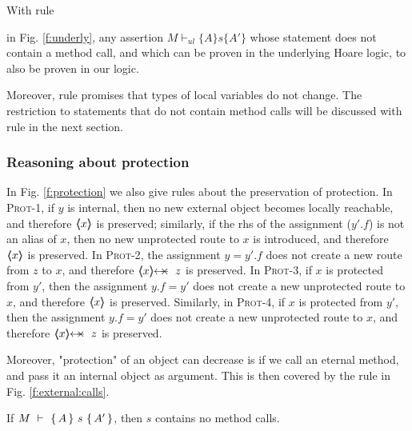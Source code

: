 \begin{axiom}
\label{ax:ul}
\end{axiom}

With rule {{\sc{extend}} in Fig. \ref{f:underly},  any assertion $M \vdash_{ul} \{ A \} s \{ A' \}$  whose statement does not contain a method call, and which 
can be proven in the underlying Hoare logic, to also be proven in our logic.


Moreover, rule {} promises that types of local variables do not change. The restriction to statements that do not contain method calls will be discussed with rule {} in the next section.

 

 \subsubsection{Reasoning about protection}

{
In Fig. \ref{f:protection} we also give rules about the preservation of protection.
In \textsc{Prot-1}, if $y$ is internal, then no new external object becomes locally reachable, and therefore $ \langle\!\!\langle x \rangle\!\!\rangle$ is preserved;
similarly, if the rhs of the assignment ($y'.f$) is not an alias of $x$, then no new unprotected route to $x$ is introduced, and therefore  $ \langle\!\!\langle x \rangle\!\!\rangle$ is preserved.
In \textsc{Prot-2}, the assignment $y=y'.f$ does not create a new route from $z$ to $x$, and therefore  $\protectedFrom{x}{z}$ is preserved.
In \textsc{Prot-3}, if $x$ is protected from $y'$, then the assignment $y.f=y'$ does not create a new unprotected route   to $x$, and therefore  $\langle\!\!\langle x \rangle\!\!\rangle$ is preserved.
Similarly, in \textsc{Prot-4}, if $x$ is protected from $y'$, then the assignment $y.f=y'$ does not create a new unprotected route  to $x$, and therefore   $\protectedFrom{x}{z}$ is preserved.
}

Moreover, "protection" of an object can decrease is if we call an eternal method, and pass it an internal object as argument. This is then covered by the rule in Fig. \ref{f:external:calls}.

\begin{lemma}
\label{l:no:meth:calls}
If ${M\ \vdash\ \{\,A\, \} \ s\  \{\,A'\, \} }$, then $s$ contains no method calls.
\end{lemma}
  


}

